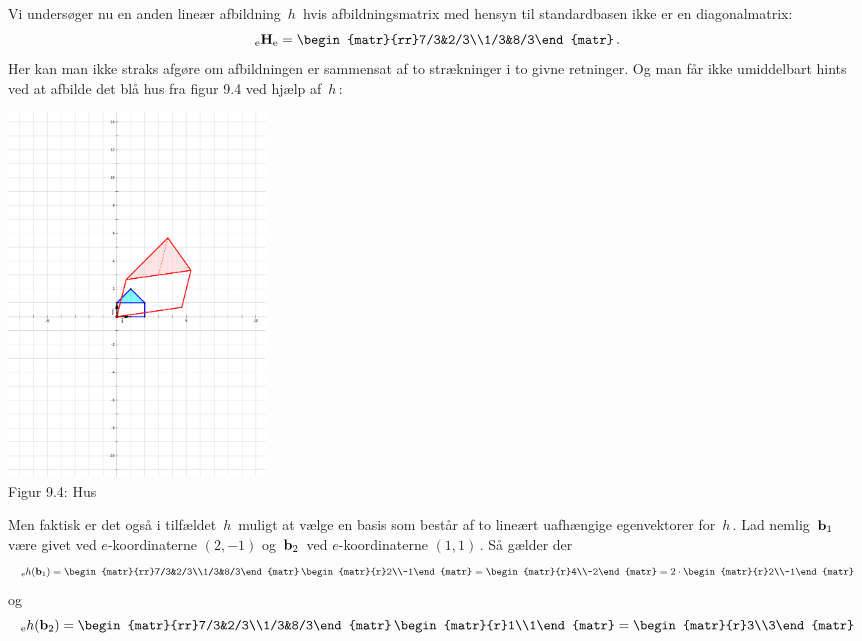\begin{example}
Vi undersøger nu en anden lineær afbildning $\,h\,$ hvis afbildningsmatrix med hensyn til standardbasen ikke er en diagonalmatrix:
\begin{equation*}
\matind eHe=\begin{matr}{rr}7/3&2/3\\1/3&8/3\end{matr}\,.
\end{equation*}
Her kan man ikke straks afgøre om afbildningen er sammensat af to strækninger i to givne retninger. Og man får ikke umiddelbart hints ved at afbilde
det blå hus fra figur 9.4 ved hjælp af $\,h\,$:
\begin{center}
\includegraphics[trim=8cm 11.6cm 5.3cm 9.4cm,width=0.30\textwidth,clip]{Hus3.pdf} \\
Figur 9.4: Hus	
\end{center}
Men faktisk er det også i tilfældet $\,h\,$ muligt at vælge en basis som består af to lineært uafhængige egenvektorer for $\,h\,$. Lad nemlig $\,\mathbf{b}_1\,$ være givet ved $e$-koordinaterne $(2,-1)$ og $\,\mathbf{b}_2\,$ ved $e$-koordinaterne $(1,1)\,$. Så gælder der
\begin{equation*}
_\mathrm{e}h(\mb_1)=\begin{matr}{rr}7/3&2/3\\1/3&8/3\end{matr}\,\begin{matr}{r}2\\-1\end{matr}=\begin{matr}{r}4\\-2\end{matr}
=2\cdot\begin{matr}{r}2\\-1\end{matr}
\end{equation*}
og
\begin{equation*}
_\mathrm{e}h(\mb_2)=\begin{matr}{rr}7/3&2/3\\1/3&8/3\end{matr}\,\begin{matr}{r}1\\1\end{matr}=\begin{matr}{r}3\\3\end{matr}

\end{equation*}
\end{example}
